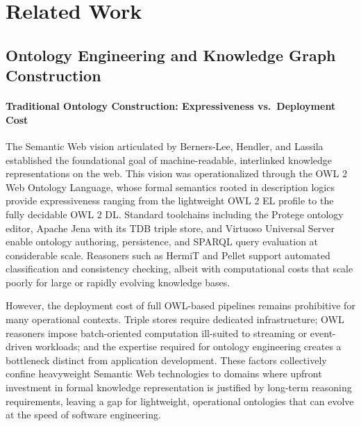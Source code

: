 \section{Related Work}\label{related-work}

\subsection{Ontology Engineering and Knowledge Graph Construction}\label{ontology-engineering-and-knowledge-graph-construction}

\paragraph{Traditional Ontology Construction: Expressiveness vs.~Deployment Cost}\label{traditional-ontology-construction-expressiveness-vs.-deployment-cost}

The Semantic Web vision articulated by Berners-Lee, Hendler, and Lassila\cite{ref1} established the foundational goal of machine-readable, interlinked knowledge representations on the web. This vision was operationalized through the OWL 2 Web Ontology Language, whose formal semantics rooted in description logics provide expressiveness ranging from the lightweight OWL 2 EL profile to the fully decidable OWL 2 DL\cite{ref2}. Standard toolchains including the Prot\textquotesingle eg\textquotesingle e ontology editor\cite{ref3}, Apache Jena with its TDB triple store\cite{ref4}, and Virtuoso Universal Server\cite{ref5} enable ontology authoring, persistence, and SPARQL query evaluation at considerable scale. Reasoners such as HermiT and Pellet support automated classification and consistency checking, albeit with computational costs that scale poorly for large or rapidly evolving knowledge bases\cite{ref6}.

However, the deployment cost of full OWL-based pipelines remains prohibitive for many operational contexts. Triple stores require dedicated infrastructure; OWL reasoners impose batch-oriented computation ill-suited to streaming or event-driven workloads; and the expertise required for ontology engineering creates a bottleneck distinct from application development\cite{ref7}. These factors collectively confine heavyweight Semantic Web technologies to domains where upfront investment in formal knowledge representation is justified by long-term reasoning requirements, leaving a gap for lightweight, operational ontologies that can evolve at the speed of software engineering.

